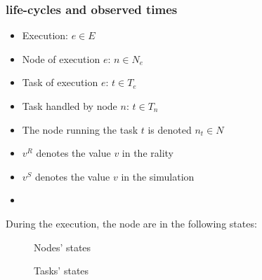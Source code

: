 \subsubsection{life-cycles and observed times}

\begin{itemize}
 \item Execution: $e \in E$
 \item Node of execution $e$: $n \in N_e$
 \item Task of execution $e$: $t \in T_e$
 \item Task handled by node $n$: $t \in T_n$
 \item The node running the task $t$ is denoted $n_t \in N$
 \item $v^R$ denotes the value $v$ in the rality
 \item $v^S$ denotes the value $v$ in the simulation
 \item 
\end{itemize}

During the execution, the node are in the following states:

\begin{figure}
\resizebox{\textwidth}{!}{%

}
\caption{Nodes' states}
\end{figure}

\begin{figure}
\resizebox{\textwidth}{!}{%

}
\caption{Tasks' states}
\end{figure}

\begin{comment}
\begin{enumerate}
 \item Future: Once the decision to start the node is made;
 \item Pending: Once the node is requested to the cloud-kit;
 \item Booting: Once the cloud-kit aknowledge the satisfaction of the request;
 \item Idle: Once the node is ready to run tasks;
 \item Busy: Once the node is running one task;
 \item ShuttingDown: Once the termination of the node is aked to the cloud-kit;
 \item Terminated: Once the node is terminated.
\end{enumerate}
\end{comment}


